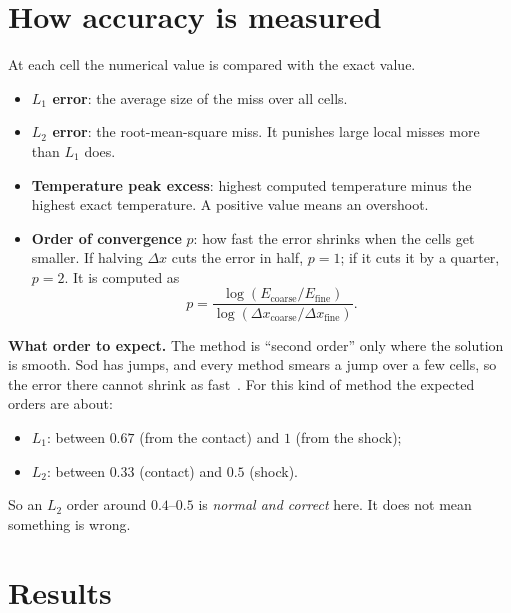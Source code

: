\documentclass[11pt]{article}
\begin{document}
\section{How accuracy is measured}

At each cell the numerical value is compared with the exact value.
\begin{itemize}
  \item \textbf{$L_1$ error}: the average size of the miss over all cells.
  \item \textbf{$L_2$ error}: the root-mean-square miss.  It punishes large local
        misses more than $L_1$ does.
  \item \textbf{Temperature peak excess}: highest computed temperature minus the
        highest exact temperature.  A positive value means an overshoot.
  \item \textbf{Order of convergence} $p$: how fast the error shrinks when the cells
        get smaller.  If halving $\Delta x$ cuts the error in half, $p = 1$; if it
        cuts it by a quarter, $p = 2$.  It is computed as
        \[
          p = \frac{\log(E_{\text{coarse}}/E_{\text{fine}})}{\log(\Delta x_{\text{coarse}}/\Delta x_{\text{fine}})}.
        \]
\end{itemize}

\begin{idea}
\textbf{What order to expect.}  The method is ``second order'' only where the
solution is smooth.  Sod has jumps, and every method smears a jump over a few
cells, so the error there cannot shrink as fast~\citep{LeVeque2002}.  For this kind
of method the expected orders are about:
\begin{itemize}[leftmargin=14pt]
  \item $L_1$: between $0.67$ (from the contact) and $1$ (from the shock);
  \item $L_2$: between $0.33$ (contact) and $0.5$ (shock).
\end{itemize}
So an $L_2$ order around $0.4$--$0.5$ is \emph{normal and correct} here.  It does
not mean something is wrong.
\end{idea}

\section{Results}
\end{document}
